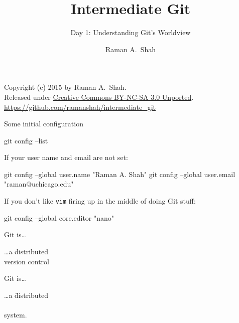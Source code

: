 

\title{Intermediate Git}
\subtitle{Day 1: Understanding Git's Worldview}
\author{Raman A.~Shah}
\date{}



\begin{frame}[plain]
  \titlepage
  \footnotesize{Copyright (c) 2015 by Raman A.~Shah.\\
  Released under
     \href{https://creativecommons.org/licenses/by-nc-sa/3.0/legalcode}
          {Creative Commons BY-NC-SA 3.0 Unported}.\\
    \href{https://github.com/ramanshah/intermediate\_git}{https://github.com/ramanshah/intermediate\_git}}

\end{frame}

\begin{frame}[fragile]{Some initial configuration}
  \begin{gitCommand}git config --list\end{gitCommand}

  If your user name and email are not set:

  \begin{gitCommand}
git config --global user.name "Raman A. Shah"
git config --global user.email "raman@uchicago.edu"
  \end{gitCommand}

  If you don't like \texttt{vim} firing up in the middle of doing Git stuff:

  \begin{gitCommand}git config --global core.editor "nano"\end{gitCommand}

\end{frame}

\begin{frame}{Git is\ldots}
  \Huge {
    \begin{tabbing}
      \ldots a \= distributed \\
      \> version control \\
      \> \color{ucMaroon}{system}\color{black}{.}
    \end{tabbing}
  }
\end{frame}

\begin{frame}{Git is\ldots}
  \Huge {
    \begin{tabbing}
      \ldots a \= distributed \\
      \> \color{ucMaroon}{version control} \\
      \> system.
    \end{tabbing}
  }
\end{frame}

